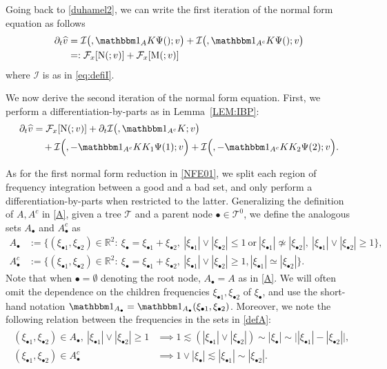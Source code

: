 \documentclass[%
11pt,  reqno]{amsart}
\makeatletter
\newcommand{\5}{\textup{V}}
\newcommand{\noi}{\noindent}
\newcommand{\ft}{\widehat}
\newcommand{\ind}{\mathbbm 1}
\newcommand{\les}{\lesssim}
\newcommand{\dt}{\partial_t}
\theoremstyle{remark}
\newcommand{\R}{\mathbb{R}}
\newcommand{\bul}{\bullet}
\newcommand{\TT}{\mathcal{T}}
\newcommand{\Ft}{{\mathcal{F}}}
\def\<#1>{\csname MH@symb@#1\endcsname}
\newcommand{\Ical}{\mathcal{I}}
\numberwithin{equation}{section}
\numberwithin{theorem}{section}
\newcommand{\MM}{\mathrm{M}}
\newcommand{\NN}{\mathrm{N}}
\makeatother
\begin{document}
Going back to \eqref{duhamel2}, we can write the first iteration of the normal form equation as follows
\begin{align}
\dt\ft v
&
= 
\Ical\big( \<1>, \ind_A K \Psi(\<1>); v 
\big)
+ \Ical\big( \<1>, \ind_{A^c} K \Psi(\<1>) ;v 
\big)
\\
&
=: \Ft_x[ \NN ( \<1>; v )] + \Ft_x[ \MM(\<1>; v) ] 
\label{NFE000}
\end{align}
where $\Ical$ is as in \eqref{eq:defiI}.

We now derive the second iteration of the normal form equation. 
First, we perform a differentiation-by-parts as in Lemma~\ref{LEM:IBP}:
\begin{align}
\label{NFE00}
\begin{split}
\dt\ft v 
&
=
 \Ft_x[ \NN ( \<1>; v )] 
+ 
\dt\Ical \big( \<1>,  \ind_{A^c} K; v \big) 
\\
&
\quad 
+
\Ical \Big( \<21>, - \ind_{A^c} KK_1\Psi(1) ; v  \Big) 
+
\Ical \Big( \<22>, - \ind_{A^c} KK_2\Psi(2) ; v  \Big) 
. 
\end{split}
\end{align}

\noi
As for the first normal form reduction in \eqref{NFE01}, we split each region of frequency integration between a good and a bad set, and only perform a differentiation-by-parts when restricted to the latter. Generalizing the definition of $A, A^c$ in \eqref{A}, given a tree $\TT$ and a parent node $\bul \in \TT^0$, we define the analogous sets $A_\bul$ and $A_\bul^c$ as
\begin{align}
A_\bul& 
:=
 \big\{ (\xi_{\bul1}, \xi_{\bul2}) \in \R^2: \ \xi_\bul =
\xi_{\bul1}
+ \xi_{\bul2}, \ |\xi_{\bul1}| \lor  |\xi_{\bul2}|  \le 1 
\ \text{or}
\
|\xi_{\bul1} | \not \simeq |\xi_{\bul2}| , \ |\xi_{\bul1}| \lor |\xi_{\bul2}| \ge 1
 \big\} , \\
A_\bul^c & := \big\{ (\xi_{\bul1}, \xi_{\bul2}) \in \R^2: \ \xi_\bul =
\xi_{\bul1} +
\xi_{\bul2},\
|\xi_{\bul1}| \lor |\xi_{\bul2}| \ge1
 , |\xi_{\bul1} |  \simeq |\xi_{\bul2}| 
\big\} 
.
\label{defA}
\end{align}
Note that when $\bul = \emptyset$ denoting the root node, $A_\bul =A$ as in \eqref{A}. 
We will often omit the dependence on the children frequencies $\xi_{\bul 1}, \xi_{\bul2}$ of $\xi_\bul$, and use the short-hand notation $\ind_{A_\bul}=\ind_{A_\bul} (\xi_{\bul1},\xi_{\bul2})$.
Moreover, we note the following relation between the frequencies in the sets in \eqref{defA}:
\begin{align}
\label{defA2}
\begin{split}
(\xi_{\bul1}, \xi_{\bul2}) \in A_\bul , \
|\xi_{\bul1}| \lor |\xi_{\bul2}| \ge 1
&
\implies 1 \les (|\xi_{\bul1}| \lor |\xi_{\bul2}|) \sim |\xi_\bul| \sim \big| | \xi_{\bul1}| - |\xi_{\bul2}| \big|
,
\\
(\xi_{\bul1}, \xi_{\bul2}) \in A_\bul^{c} 
&
\implies 1 \lor  |\xi_{\bul}|  \les |\xi_{\bul1}| \sim |\xi_{\bul2}|
.
\end{split}
\end{align}
\end{document}
